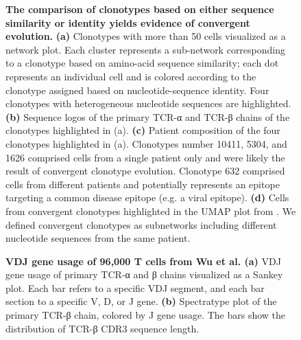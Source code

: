 \documentclass{article}
\begin{document}
\newpage
\begin{figure}[!ht]
  \centering
  
  \caption{\textbf{The comparison of clonotypes based on either sequence similarity or identity yields evidence of convergent evolution.} \textbf{(a)} Clonotypes with more than 50 cells visualized as a network plot. Each cluster represents a sub-network corresponding to a clonotype based on amino-acid sequence similarity; each dot represents an individual cell and is colored according to the clonotype assigned based on nucleotide-sequence identity. Four clonotypes with heterogeneous nucleotide sequences are highlighted. \textbf{(b)} Sequence logos of the primary TCR-α and TCR-β chains of the clonotypes highlighted in (a). \textbf{(c)} Patient composition of the four clonotypes highlighted in (a). Clonotypes number 10411, 5304, and 1626 comprised cells from a single patient only and were likely the result of convergent clonotype evolution. Clonotype 632 comprised cells from different patients and potentially represents an epitope targeting a common disease epitope (e.g. a viral epitope). \textbf{(d)} Cells from convergent clonotypes highlighted in the UMAP plot from \cite{Wu2020-vp}. We defined convergent clonotypes as subnetworks including different nucleotide sequences from the same patient.}
\end{figure}

\newpage
\begin{figure}[!ht]
  \centering
  
  \caption{\textbf{VDJ gene usage of 96,000 T cells from Wu et al. \cite{Wu2020-vp}} \textbf{(a)} VDJ gene usage of primary TCR-α and β chains visualized as a Sankey plot. Each bar refers to a specific VDJ segment, and each bar section to a specific V, D, or J gene. \textbf{(b)} Spectratype plot of the primary TCR-β chain, colored by J gene usage. The bars show the distribution of TCR-β CDR3 sequence length.}
\end{figure}
\end{document}
